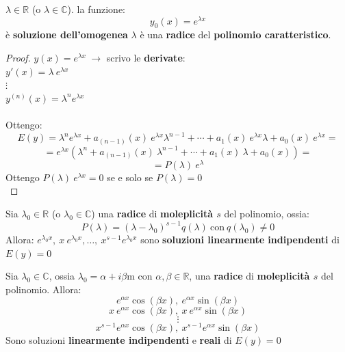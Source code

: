\documentclass[a4paper, oneside]{article}
\newcommand\R{\mathbb{R}}
\newcommand\C{\mathbb{C}}
\begin{document}
    \begin{theorem}
         $\lambda\in\R$ (o $\lambda\in\C$).  la funzione:
        \[y_0(x) = e^{\lambda x}\]
        è \textbf{soluzione dell'omogenea}  $\lambda$ è una \textbf{radice} del \textbf{polinomio caratteristico}.

        \begin{proof}
            $y(x) = e^{\lambda x} \ \to$ scrivo le \textbf{derivate}:\\
            $y'(x) = \lambda \ e^{\lambda x}$\\
            $\vdots$\\
            $y^{(n)}(x) = \lambda^n e^{\lambda x}$\\\\
            Ottengo:\\
            \[E(y) = \lambda^ne^{\lambda x} + a_{(n-1)}(x) \ e^{\lambda x}\lambda^{n-1} + \cdots + a_1(x) \ e^{\lambda x}\lambda + a_0(x) \ e^{\lambda x} = \]
            \[=e^{\lambda x}\left(\lambda^n + a_{(n-1)}(x) \ \lambda^{n-1} + \cdots + a_1(x) \ \lambda + a_0(x)\right) =\]
            \[=P(\lambda) \ e^{\lambda}\]
            Ottengo $P(\lambda) \ e^{\lambda x}=0$ se e solo se $P(\lambda) = 0$\\
        \end{proof}
    \end{theorem}

    \begin{theorem}
        Sia $\lambda_0\in\R$ (o $\lambda_0\in\C$) una \textbf{radice} di \textbf{moleplicità $s$} del polinomio, ossia:
        \[P(\lambda) = \left(\lambda-\lambda_0\right)^{s-1}q(\lambda) \ \text{con} \ q(\lambda_0)\ne 0\]
        Allora:
        $e^{\lambda_0x}, \ x \ e^{\lambda_0x},\dots, \ x^{s-1}e^{\lambda_0x}$ sono \textbf{soluzioni linearmente indipendenti} di $E(y) = 0$
    \end{theorem}

    \begin{theorem}
        Sia $\lambda_0\in\C$, ossia $\lambda_0 = \alpha + i\beta$m con $\alpha,\beta\in\R$, una \textbf{radice} di \textbf{moleplicità $s$} del polinomio. 
        Allora:
        \[e^{\alpha x}\cos(\beta x), \ e^{\alpha x}\sin(\beta x)\]
        \[x \ e^{\alpha x}\cos(\beta x), \ x \ e^{\alpha x}\sin(\beta x)\]
        \[\vdots\] 
        \[x^{s-1}e^{\alpha x}\cos(\beta x), \ x^{s-1}e^{\alpha x}\sin(\beta x)\]
        Sono soluzioni \textbf{linearmente indipendenti} e \textbf{reali} di $E(y) = 0$
    \end{theorem}
    
\end{document}
